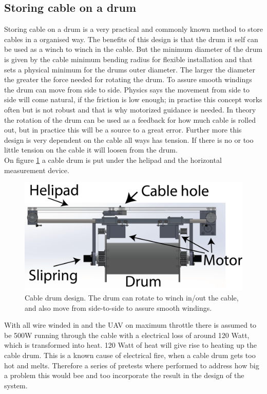 \subsection{Storing cable on a drum}
Storing cable on a drum is a very practical and commonly known method to store cables in a organised way. The benefits of this design is that the drum it self can be used as a winch to winch in the cable. But the minimum diameter of the drum is given by the cable minimum bending radius for flexible installation and that sets a physical minimum for the drums outer diameter. The larger the diameter the greater the force needed for rotating the drum. To assure smooth windings the drum can move from side to side. Physics says the movement from side to side will come natural, if the friction is low enough; in practise this concept works often but is not robust and that is why motorized guidance is needed. In theory the rotation of the drum can be used as a feedback for how much cable is rolled out, but in practice this will be a source to a great error. Further more this design is very dependent on the cable all ways has tension. If there is no or too little tension on the cable it will loosen from the drum. \\
On figure \ref{fig:cable-drum} a cable drum is put under the helipad and the horizontal measurement device. 

\begin{figure}[H]
\centering
\includegraphics[scale=0.75]{graphics/cad/cable-drum.png}
\caption{Cable drum design. The drum can rotate to winch in/out the cable, and also move from side-to-side to assure smooth windings.}
\label{fig:cable-drum}
\end{figure}

\noindent
With all wire winded in and the UAV on maximum throttle there is assumed to be 500W running through the cable with a electrical loss of around 120 Watt, which is transformed into heat. 120 Watt of heat will give rise to heating up the cable drum. This is a known cause of electrical fire, when a cable drum gets too hot and melts. Therefore a series of pretests where performed to address how big a problem this would bee and too incorporate the result in the design of the system. 

